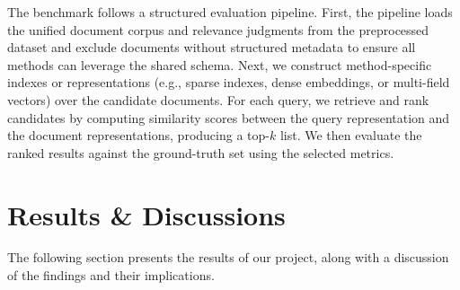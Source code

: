 \documentclass[11pt]{article}
\begin{document}
The benchmark follows a structured evaluation pipeline. First, the pipeline loads the unified document corpus and relevance judgments from the preprocessed dataset and exclude documents without structured metadata to ensure all methods can leverage the shared schema. Next, we construct method-specific indexes or representations (e.g., sparse indexes, dense embeddings, or multi-field vectors) over the candidate documents. For each query, we retrieve and rank candidates by computing similarity scores between the query representation and the document representations, producing a top-$k$ list. We then evaluate the ranked results against the ground-truth set using the selected metrics.

\section{Results \& Discussions}
The following section presents the results of our project, along with a discussion of the findings and their implications.
\end{document}
